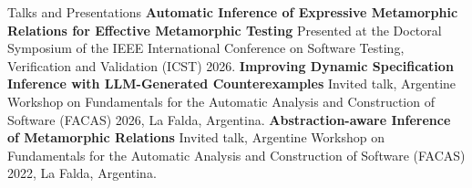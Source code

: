 \begin{rubric}{Talks and Presentations}
\entry*[2026]
    \textbf{Automatic Inference of Expressive Metamorphic Relations for Effective Metamorphic Testing}
    \newline Presented at the Doctoral Symposium of the IEEE International Conference on Software Testing, Verification and Validation (ICST) 2026.
\entry*[2026]
    \textbf{Improving Dynamic Specification Inference with LLM-Generated Counterexamples}
    \newline Invited talk, Argentine Workshop on Fundamentals for the Automatic Analysis and Construction of Software (FACAS) 2026, La Falda, Argentina.
\entry*[2022] 
    \textbf{Abstraction-aware Inference of Metamorphic Relations}
    \newline Invited talk, Argentine Workshop on Fundamentals for the Automatic Analysis and Construction of Software (FACAS) 2022, La Falda, Argentina.
\end{rubric}